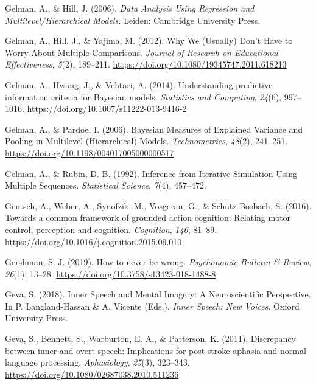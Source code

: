 \documentclass[a4paper,12pt,twoside,openright,oldfontcommands]{memoir}
\begin{document}
\leavevmode\hypertarget{ref-gelman_data_2006}{}%
Gelman, A., \& Hill, J. (2006). \emph{Data Analysis Using Regression and Multilevel/Hierarchical Models.} Leiden: Cambridge University Press.

\leavevmode\hypertarget{ref-gelman_why_2012}{}%
Gelman, A., Hill, J., \& Yajima, M. (2012). Why We (Usually) Don't Have to Worry About Multiple Comparisons. \emph{Journal of Research on Educational Effectiveness}, \emph{5}(2), 189--211. \url{https://doi.org/10.1080/19345747.2011.618213}

\leavevmode\hypertarget{ref-gelman_understanding_2014}{}%
Gelman, A., Hwang, J., \& Vehtari, A. (2014). Understanding predictive information criteria for Bayesian models. \emph{Statistics and Computing}, \emph{24}(6), 997--1016. \url{https://doi.org/10.1007/s11222-013-9416-2}

\leavevmode\hypertarget{ref-gelman_bayesian_2006}{}%
Gelman, A., \& Pardoe, I. (2006). Bayesian Measures of Explained Variance and Pooling in Multilevel (Hierarchical) Models. \emph{Technometrics}, \emph{48}(2), 241--251. \url{https://doi.org/10.1198/004017005000000517}

\leavevmode\hypertarget{ref-gelman_inference_1992}{}%
Gelman, A., \& Rubin, D. B. (1992). Inference from Iterative Simulation Using Multiple Sequences. \emph{Statistical Science}, \emph{7}(4), 457--472.

\leavevmode\hypertarget{ref-gentsch_towards_2016}{}%
Gentsch, A., Weber, A., Synofzik, M., Vosgerau, G., \& Schütz-Bosbach, S. (2016). Towards a common framework of grounded action cognition: Relating motor control, perception and cognition. \emph{Cognition}, \emph{146}, 81--89. \url{https://doi.org/10.1016/j.cognition.2015.09.010}

\leavevmode\hypertarget{ref-gershman_how_2019}{}%
Gershman, S. J. (2019). How to never be wrong. \emph{Psychonomic Bulletin \& Review}, \emph{26}(1), 13--28. \url{https://doi.org/10.3758/s13423-018-1488-8}

\leavevmode\hypertarget{ref-geva_inner_2018}{}%
Geva, S. (2018). Inner Speech and Mental Imagery: A Neuroscientific Perspective. In P. Langland-Hassan \& A. Vicente (Eds.), \emph{Inner Speech: New Voices}. Oxford University Press.

\leavevmode\hypertarget{ref-geva_discrepancy_2011}{}%
Geva, S., Bennett, S., Warburton, E. A., \& Patterson, K. (2011). Discrepancy between inner and overt speech: Implications for post-stroke aphasia and normal language processing. \emph{Aphasiology}, \emph{25}(3), 323--343. \url{https://doi.org/10.1080/02687038.2010.511236}
\end{document}
